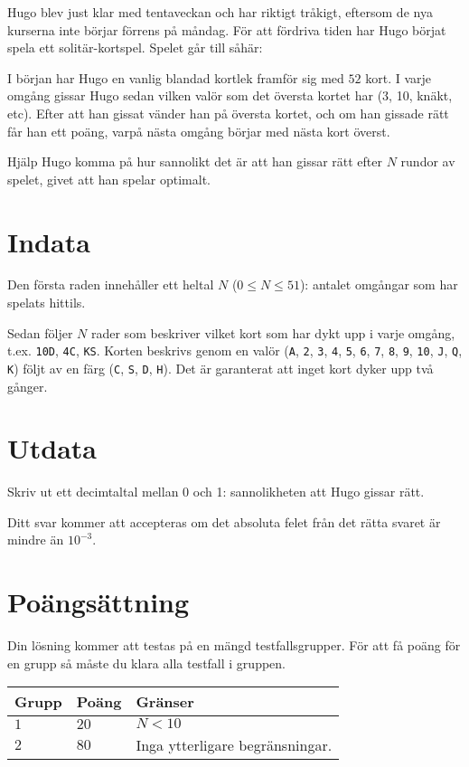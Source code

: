 Hugo blev just klar med tentaveckan och har riktigt tråkigt, eftersom de nya kurserna inte börjar förrens på måndag.
För att fördriva tiden har Hugo börjat spela ett solitär-kortspel. Spelet går till såhär:

I början har Hugo en vanlig blandad kortlek framför sig med $52$ kort. I varje omgång gissar Hugo sedan vilken valör som det översta kortet har (3, 10, knäkt, etc).
Efter att han gissat vänder han på översta kortet, och om han gissade rätt får han ett poäng, varpå nästa omgång börjar med nästa kort överst.

Hjälp Hugo komma på hur sannolikt det är att han gissar rätt efter $N$ rundor av spelet, givet att han spelar optimalt.

\section*{Indata}
Den första raden innehåller ett heltal $N$ ($0 \le N \le 51$): antalet omgångar som har spelats hittils.

Sedan följer $N$ rader som beskriver vilket kort som har dykt upp i varje omgång, t.ex. \texttt{10D}, \texttt{4C}, \texttt{KS}.
Korten beskrivs genom en valör (\texttt{A}, \texttt{2}, \texttt{3}, \texttt{4}, \texttt{5}, \texttt{6}, \texttt{7}, \texttt{8},
\texttt{9}, \texttt{10}, \texttt{J}, \texttt{Q}, \texttt{K}) följt av en färg (\texttt{C}, \texttt{S}, \texttt{D}, \texttt{H}).
Det är garanterat att inget kort dyker upp två gånger.

\section*{Utdata}
Skriv ut ett decimtaltal mellan 0 och 1: sannolikheten att Hugo gissar rätt.

Ditt svar kommer att accepteras om det absoluta felet från det rätta svaret är mindre än $10^{-3}$.

\section*{Poängsättning}
Din lösning kommer att testas på en mängd testfallsgrupper.
För att få poäng för en grupp så måste du klara alla testfall i gruppen.

\noindent
\begin{tabular}{| l | l | p{12cm} |}
  \hline
  \textbf{Grupp} & \textbf{Poäng} & \textbf{Gränser} \\ \hline
  $1$    & $20$       & $N < 10$ \\ \hline
  $2$    & $80$       & Inga ytterligare begränsningar. \\ \hline
\end{tabular}
